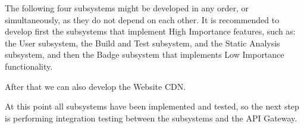 The following four subsystems might be developed in any order, or simultaneously, as they do not depend
on each other.
It is recommended to develop first the subsystems that implement High Importance features, such as:\\
the User subsystem, the Build and Test subsystem, and the Static Analysis subsystem, and then the Badge subsystem that implements Low Importance functionality.
\begin{adjustbox}{
        max size={\textwidth}{},
        center,
        caption={User subsystem},
        label={fig:User subsystem},
        figure=H}
\end{adjustbox}

\begin{adjustbox}{
        max size={\textwidth}{},
        center,
        caption={Build and Test subsystem},
        label={fig:Build and Test subsystem},
        figure=H}
\end{adjustbox}

\begin{adjustbox}{
        max size={\textwidth}{},
        center,
        caption={Static Analysis subsystem},
        label={fig:Static Analysis  subsystem},
        figure=H}
\end{adjustbox}

\begin{adjustbox}{
        max size={\textwidth}{},
        center,
        caption={Badge subsystem},
        label={fig:Badge subsystem},
        figure=H}
\end{adjustbox}

After that we can also develop the Website CDN.
\begin{adjustbox}{
        max size={\textwidth}{},
        center,
        caption={Website CDN subsystem},
        label={fig:Website CDN subsystem},
        figure=H}
\end{adjustbox}

At this point all subsystems have been implemented and tested, so the next step is performing integration
testing between the subsystems and the API Gateway.
\begin{adjustbox}{
        max size={\textwidth}{},
        center,
        caption={API Gateway subsystem},
        label={fig:API Gateway subsystem},
        figure=H}
\end{adjustbox}

